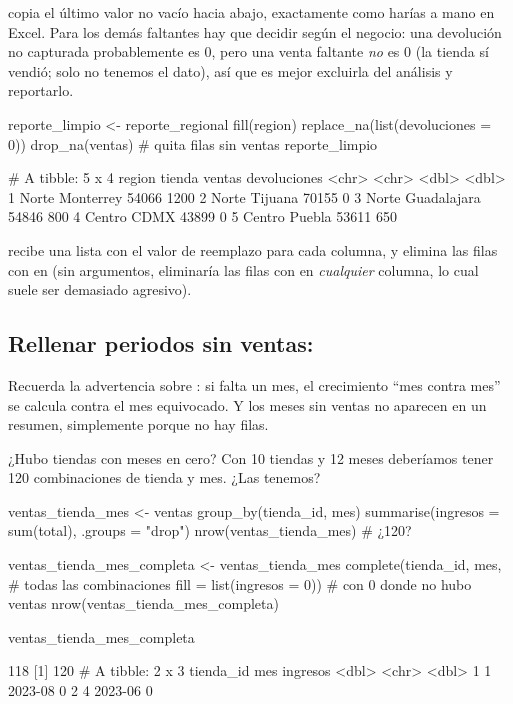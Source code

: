  copia el último valor no vacío hacia abajo, exactamente como
harías a mano en Excel. Para los demás faltantes hay que decidir según el
negocio: una devolución no capturada probablemente es 0, pero una venta
faltante \emph{no} es 0 (la tienda sí vendió; solo no tenemos el dato), así
que es mejor excluirla del análisis y reportarlo.

\begin{rcode}
reporte_limpio <- reporte_regional %
  fill(region) %
  replace_na(list(devoluciones = 0)) %
  drop_na(ventas)                          # quita filas sin ventas
reporte_limpio
\end{rcode}
\begin{rsalida}
# A tibble: 5 x 4
  region tienda      ventas devoluciones
  <chr>  <chr>        <dbl>        <dbl>
1 Norte  Monterrey    54066         1200
2 Norte  Tijuana      70155            0
3 Norte  Guadalajara  54846          800
4 Centro CDMX         43899            0
5 Centro Puebla       53611          650
\end{rsalida}

 recibe una lista con el valor de reemplazo para cada
columna, y  elimina las filas con  en
 (sin argumentos, eliminaría las filas con  en
\emph{cualquier} columna, lo cual suele ser demasiado agresivo).

\subsection{Rellenar periodos sin ventas: \texorpdfstring{}{complete()}}
\label{sec:m2-complete}

Recuerda la advertencia sobre : si falta un mes, el
crecimiento ``mes contra mes'' se calcula contra el mes equivocado. Y los
meses sin ventas no aparecen en un resumen, simplemente porque no hay filas.

\begin{ejemplo}{¿Hubo tiendas con meses en cero?}
Con 10 tiendas y 12 meses deberíamos tener 120 combinaciones de tienda y
mes. ¿Las tenemos?
\end{ejemplo}

\begin{rcode}
ventas_tienda_mes <- ventas %
  group_by(tienda_id, mes) %
  summarise(ingresos = sum(total), .groups = "drop")
nrow(ventas_tienda_mes)            # ¿120?

ventas_tienda_mes_completa <- ventas_tienda_mes %
  complete(tienda_id, mes,                 # todas las combinaciones
           fill = list(ingresos = 0))      # con 0 donde no hubo ventas
nrow(ventas_tienda_mes_completa)

ventas_tienda_mes_completa %
\end{rcode}
\begin{rsalida}
[1] 118
[1] 120
# A tibble: 2 x 3
  tienda_id mes     ingresos
      <dbl> <chr>      <dbl>
1         1 2023-08        0
2         4 2023-06        0
\end{rsalida}

